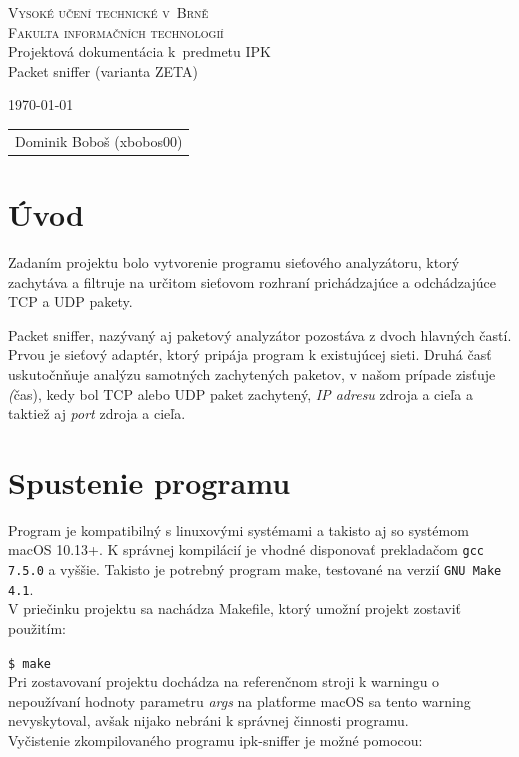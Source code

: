 \documentclass[11pt, a4paper]{article}
\begin{document}
	\begin{titlepage}
		\begin{center}
			\Huge
			\textsc{Vysoké učení technické v~Brně} \\
			\huge
			\textsc{Fakulta informačních technologií} \\
			\LARGE
			Projektová dokumentácia k~predmetu IPK \\
			\Huge
			Packet sniffer (varianta ZETA)
		\end{center}

		{\Large
			\today
			\hfill
			\begin{tabular}{r}
			Dominik Boboš (xbobos00)
			\end{tabular}
		}
	\end{titlepage}
	
	\tableofcontents
	\newpage


	\section{Úvod}
	Zadaním projektu bolo vytvorenie programu sieťového analyzátoru, ktorý zachytáva a filtruje na určitom sieťovom rozhraní prichádzajúce a odchádzajúce TCP a UDP pakety.
	
	Packet sniffer, nazývaný aj paketový analyzátor pozostáva z dvoch hlavných častí. Prvou je sieťový adaptér, ktorý pripája program k existujúcej sieti. Druhá časť uskutočnňuje analýzu samotných zachytených paketov, v našom prípade zisťuje \emph(čas), kedy bol TCP alebo UDP paket zachytený, \emph{IP adresu} zdroja a cieľa a taktiež aj \emph{port} zdroja a cieľa\cite{Paessler}.
	
	
	
	\section{Spustenie programu}
	Program je kompatibilný s linuxovými systémami a takisto aj so systémom macOS 10.13+. K správnej kompilácií je vhodné disponovať prekladačom \texttt{gcc 7.5.0} a vyššie. Takisto je potrebný program make, testované na verzií \texttt{GNU Make 4.1}.\\
V priečinku projektu sa nachádza Makefile, ktorý umožní projekt zostaviť použitím:

\texttt{\$ make}\\
Pri zostavovaní projektu dochádza na referenčnom stroji k warningu o nepoužívaní hodnoty parametru \emph{args} na platforme macOS sa tento warning nevyskytoval, avšak nijako nebráni k správnej činnosti programu.\\
Vyčistenie zkompilovaného programu ipk-sniffer je možné pomocou:
\end{document}
